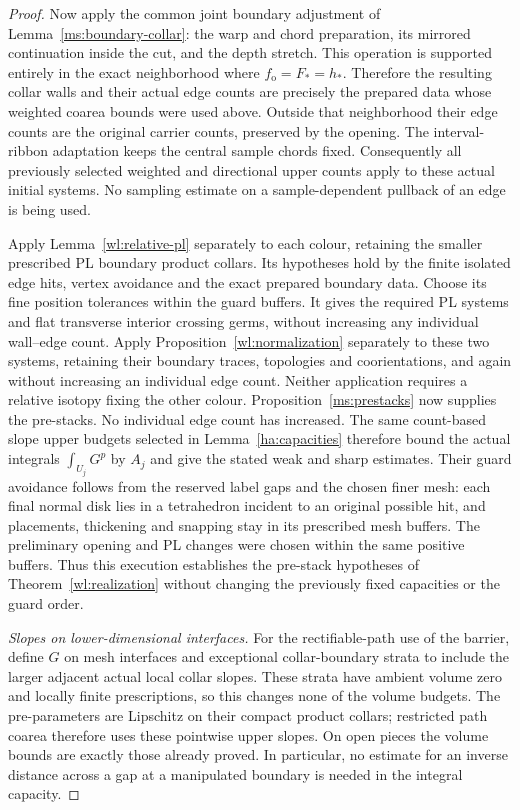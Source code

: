 \documentclass[11pt]{article}
\numberwithin{equation}{section}
\theoremstyle{definition}
\theoremstyle{remark}
\begin{document}
\begin{proof}
Now apply the common joint boundary adjustment of
Lemma~\ref{ms:boundary-collar}: the warp and chord preparation,
its mirrored continuation inside the cut, and the depth stretch.
This operation is supported entirely in the exact neighborhood
where $f_{\mathrm o}=F_*=h_*$.  Therefore the resulting collar
walls and their actual edge counts are precisely the prepared
data whose weighted coarea bounds were used above.  Outside that
neighborhood their edge counts are the original carrier counts,
preserved by the opening.  The interval-ribbon adaptation keeps
the central sample chords fixed.  Consequently all previously
selected weighted and directional upper counts apply to these
actual initial systems.  No sampling estimate on a
sample-dependent pullback of an edge is being used.

Apply Lemma~\ref{wl:relative-pl} separately to each colour,
retaining the smaller prescribed PL boundary product collars.
Its hypotheses hold by the finite isolated edge hits, vertex
avoidance and the exact prepared boundary data.  Choose its fine
position tolerances within the guard buffers.  It gives the
required PL systems and flat transverse interior crossing germs,
without increasing any individual wall--edge count.  Apply
Proposition~\ref{wl:normalization} separately to these two systems,
retaining their boundary traces, topologies and coorientations,
and again without increasing an individual edge count.  Neither
application requires a relative isotopy fixing the other colour.
Proposition~\ref{ms:prestacks} now supplies the pre-stacks.
No individual edge count has increased.  The same count-based
slope upper budgets selected in Lemma~\ref{ha:capacities} therefore
bound the actual integrals $\int_{U_j}G^p$ by $A_j$ and give the
stated weak and sharp estimates.  Their guard avoidance follows from the
reserved label gaps and the chosen finer mesh: each final normal
disk lies in a tetrahedron incident to an original possible hit,
and placements, thickening and snapping stay in its prescribed
mesh buffers.  The preliminary opening and PL changes were chosen
within the same positive buffers.  Thus this execution establishes
the pre-stack hypotheses of Theorem~\ref{wl:realization} without
changing the previously fixed capacities or the guard order.

\emph{Slopes on lower-dimensional interfaces.}
For the rectifiable-path use of the barrier, define $G$ on mesh
interfaces and exceptional collar-boundary strata to include the
larger adjacent actual local collar slopes.  These strata have
ambient volume zero and locally finite prescriptions, so this
changes none of the volume budgets.  The pre-parameters are
Lipschitz on their compact product collars; restricted path coarea
therefore uses these pointwise upper slopes.  On open pieces the
volume bounds are exactly those already proved.  In particular,
no estimate for an inverse distance across a gap at a manipulated
boundary is needed in the integral capacity.
\end{proof}
\end{document}
